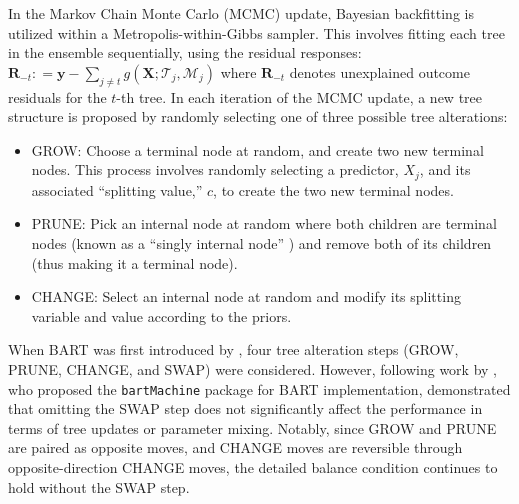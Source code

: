 In the Markov Chain Monte Carlo (MCMC) update, Bayesian backfitting\citep{hastie2000bayesian} is utilized within a Metropolis-within-Gibbs sampler. This involves fitting each tree in the ensemble sequentially, using the residual responses: $\mathbf{R}_{-t} : = \mathbf{y} - \sum_{j \neq t} g(\boldsymbol{X}; \mathcal{T}_j, \mathcal{M}_j)$ where $\mathbf{R}_{-t}$ denotes unexplained outcome residuals for the $t$-th tree. In each iteration of the MCMC update, a new tree structure is proposed by randomly selecting one of three possible tree alterations: 
\begin{itemize}
\item[] GROW: Choose a terminal node at random, and create two new terminal nodes. This process involves randomly selecting a predictor, $X_j$, and its associated ``splitting value,'' $c$, to create the two new terminal nodes.
\item[] PRUNE: Pick an internal node at random where both children are terminal nodes (known as a ``singly internal node'' \citep{kapelner2013bartmachine}) and remove both of its children (thus making it a terminal node).
\item[] CHANGE: Select an internal node at random and modify its splitting variable and value according to the priors.
\end{itemize}
When BART was first introduced by \citet{chipman2010bart}, four tree alteration steps (GROW, PRUNE, CHANGE, and SWAP) were considered. However, following work by \citet{kapelner2013bartmachine}, who proposed the \verb|bartMachine| package for BART implementation, demonstrated that omitting the SWAP step does not significantly affect the performance in terms of tree updates or parameter mixing. Notably, since GROW and PRUNE are paired as opposite moves, and CHANGE moves are reversible through opposite-direction CHANGE moves, the detailed balance condition continues to hold without the SWAP step.
